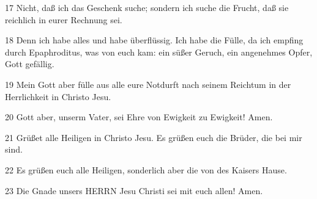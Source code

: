 \par 17 Nicht, daß ich das Geschenk suche; sondern ich suche die Frucht, daß sie reichlich in eurer Rechnung sei.
\par 18 Denn ich habe alles und habe überflüssig. Ich habe die Fülle, da ich empfing durch Epaphroditus, was von euch kam: ein süßer Geruch, ein angenehmes Opfer, Gott gefällig.
\par 19 Mein Gott aber fülle aus alle eure Notdurft nach seinem Reichtum in der Herrlichkeit in Christo Jesu.
\par 20 Gott aber, unserm Vater, sei Ehre von Ewigkeit zu Ewigkeit! Amen.
\par 21 Grüßet alle Heiligen in Christo Jesu. Es grüßen euch die Brüder, die bei mir sind.
\par 22 Es grüßen euch alle Heiligen, sonderlich aber die von des Kaisers Hause.
\par 23 Die Gnade unsers HERRN Jesu Christi sei mit euch allen! Amen.


